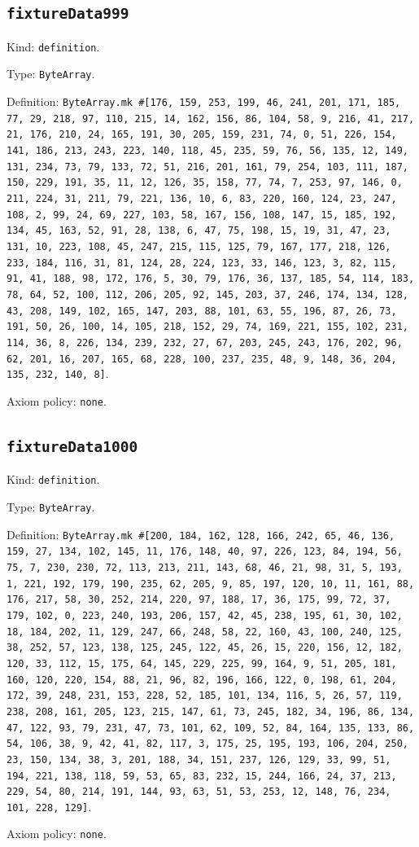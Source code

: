 \documentclass[11pt]{article}
\begin{document}
\subsection*{\texttt{fixtureData999}}
\noindent Kind: \texttt{definition}.\par
\noindent Type: \texttt{ByteArray}.\par
\noindent Definition: \texttt{ByteArray.mk \#[176, 159, 253, 199, 46, 241, 201, 171, 185, 77, 29, 218, 97, 110, 215, 14, 162, 156, 86, 104, 58, 9, 216, 41, 217, 21, 176, 210, 24, 165, 191, 30, 205, 159, 231, 74, 0, 51, 226, 154, 141, 186, 213, 243, 223, 140, 118, 45, 235, 59, 76, 56, 135, 12, 149, 131, 234, 73, 79, 133, 72, 51, 216, 201, 161, 79, 254, 103, 111, 187, 150, 229, 191, 35, 11, 12, 126, 35, 158, 77, 74, 7, 253, 97, 146, 0, 211, 224, 31, 211, 79, 221, 136, 10, 6, 83, 220, 160, 124, 23, 247, 108, 2, 99, 24, 69, 227, 103, 58, 167, 156, 108, 147, 15, 185, 192, 134, 45, 163, 52, 91, 28, 138, 6, 47, 75, 198, 15, 19, 31, 47, 23, 131, 10, 223, 108, 45, 247, 215, 115, 125, 79, 167, 177, 218, 126, 233, 184, 116, 31, 81, 124, 28, 224, 123, 33, 146, 123, 3, 82, 115, 91, 41, 188, 98, 172, 176, 5, 30, 79, 176, 36, 137, 185, 54, 114, 183, 78, 64, 52, 100, 112, 206, 205, 92, 145, 203, 37, 246, 174, 134, 128, 43, 208, 149, 102, 165, 147, 203, 88, 101, 63, 55, 196, 87, 26, 73, 191, 50, 26, 100, 14, 105, 218, 152, 29, 74, 169, 221, 155, 102, 231, 114, 36, 8, 226, 134, 239, 232, 27, 67, 203, 245, 243, 176, 202, 96, 62, 201, 16, 207, 165, 68, 228, 100, 237, 235, 48, 9, 148, 36, 204, 135, 232, 140, 8]}.\par
\noindent Axiom policy: \texttt{none}.\par
\subsection*{\texttt{fixtureData1000}}
\noindent Kind: \texttt{definition}.\par
\noindent Type: \texttt{ByteArray}.\par
\noindent Definition: \texttt{ByteArray.mk \#[200, 184, 162, 128, 166, 242, 65, 46, 136, 159, 27, 134, 102, 145, 11, 176, 148, 40, 97, 226, 123, 84, 194, 56, 75, 7, 230, 230, 72, 113, 213, 211, 143, 68, 46, 21, 98, 31, 5, 193, 1, 221, 192, 179, 190, 235, 62, 205, 9, 85, 197, 120, 10, 11, 161, 88, 176, 217, 58, 30, 252, 214, 220, 97, 188, 17, 36, 175, 99, 72, 37, 179, 102, 0, 223, 240, 193, 206, 157, 42, 45, 238, 195, 61, 30, 102, 18, 184, 202, 11, 129, 247, 66, 248, 58, 22, 160, 43, 100, 240, 125, 38, 252, 57, 123, 138, 125, 245, 122, 45, 26, 15, 220, 156, 12, 182, 120, 33, 112, 15, 175, 64, 145, 229, 225, 99, 164, 9, 51, 205, 181, 160, 120, 220, 154, 88, 21, 96, 82, 196, 166, 122, 0, 198, 61, 204, 172, 39, 248, 231, 153, 228, 52, 185, 101, 134, 116, 5, 26, 57, 119, 238, 208, 161, 205, 123, 215, 147, 61, 73, 245, 182, 34, 196, 86, 134, 47, 122, 93, 79, 231, 47, 73, 101, 62, 109, 52, 84, 164, 135, 133, 86, 54, 106, 38, 9, 42, 41, 82, 117, 3, 175, 25, 195, 193, 106, 204, 250, 23, 150, 134, 38, 3, 201, 188, 34, 151, 237, 126, 129, 33, 99, 51, 194, 221, 138, 118, 59, 53, 65, 83, 232, 15, 244, 166, 24, 37, 213, 229, 54, 80, 214, 191, 144, 93, 63, 51, 53, 253, 12, 148, 76, 234, 101, 228, 129]}.\par
\noindent Axiom policy: \texttt{none}.\par
\end{document}
